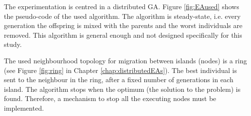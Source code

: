 The experimentation is centred in a distributed GA. Figure \ref{fig:EAused} shows the pseudo-code of the used algorithm. 
The algorithm is steady-state, i.e. every generation the offspring is
mixed with the parents and the worst individuals are removed. This algorithm is general enough and not designed specifically for this study.

 The used neighbourhood topology for migration between islands (nodes)
 is a ring (see Figure \ref{fig:ring} in Chapter
 \ref{chap:distributedEAs}). The best individual is sent to the
 neighbour in the ring, after a fixed number of generations in each
 island. The algorithm stops when the optimum (the solution to the
 problem) is found.   %
Therefore, a mechanism to stop all the executing nodes must be implemented.

\newsavebox{\algoadaptativebox}
\begin{lrbox}{\algoadaptativebox}
\end{lrbox}

